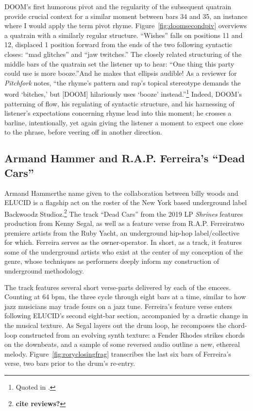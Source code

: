 DOOM's first humorous pivot and the regularity of the subsequent quatrain provide crucial context
for a similar moment between bars 34 and 35, an instance where I would apply the term pivot rhyme.
Figure~\ref{fig:doomsecondpiv} overviews a quatrain with a similarly regular structure. ``Wishes'' 
falls on positions 11 and 12, displaced 1 position forward from the ends of the two following 
syntactic  closes: ``mad glitches'' and ``jaw twitches.'' The closely related structuring of the 
middle bars of the quatrain set the listener up to hear: ``One thing this party could use is more\textellipsis
booze.''And he makes that ellipsis audible! As a reviewer for \textit{Pitchfork} notes, ``the rhyme's 
pattern and rap's topical stereotype demands the word `bitches,' but [DOOM] hilariously uses `booze'
instead.''\footnote{
    Quoted in \cite{estellecaswellRappingDeconstructedBest2016}.}
Indeed, DOOM's patterning of flow, his regulating of syntactic structure, and his harnessing of
listener's expectations concerning rhyme lead into this moment; he crosses a barline, intentionally,
yet again giving the listener a moment to expect one close to the phrase, before veering off in 
another direction.

\clearpage
{}
\subsection*{\centering Armand Hammer and R.A.P. Ferreira's ``Dead Cars''}

Armand Hammer\textemdash the name given to the collaboration between billy woods and ELUCID\textemdash
is a flagship act on the roster of the New York based underground label Backwoodz Studioz.\footnote{
    \textbf{cite reviews?}}
The track ``Dead Cars'' from the 2019 LP \textit{Shrines} features production from Kenny Segal, as well
as a feature verse from R.A.P. Ferreira\textemdash two premiere artists from the Ruby Yacht, an underground
hip-hop label/collective for which. Ferreira serves as the owner-operator. In short, as a track, it features
some of the underground artists who exist at the center of my conception of the genre, whose techniques as
performers deeply inform my construction of underground methodology.

The track features several short verse-parts delivered by each of the emcees. Counting at 64 bpm, the three
cycle through eight bars at a time, similar to how jazz musicians may trade fours on a jazz tune. Ferreira's
feature verse enters following ELUCID's second eight-bar section, accompanied by a drastic change in the musical
texture. As Segal layers out the drum loop, he recomposes the chord-loop constructed from an evolving synth 
texture: a Fender Rhodes strikes chords on the downbeats, and a sample of some reversed audio outline a new, 
ethereal melody. Figure~\ref{fig:roryclosingfrag} transcribes the last six bars of Ferreira's verse, two bars
prior to the drum's re-entry.

